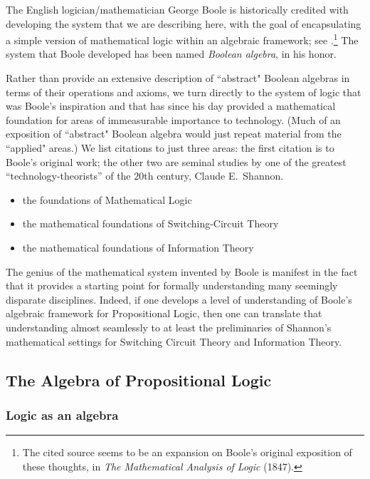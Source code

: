 The English logician/mathematician George Boole is historically credited with developing the system that we are describing here, with the goal of encapsulating a simple version of
mathematical logic within an algebraic framework; see
\cite{Boole54}.\footnote{The cited source seems to be an expansion on Boole's original exposition of these thoughts, in {\it The Mathematical Analysis of Logic} (1847).}  The system that Boole developed has been named {\it Boolean algebra}, in his honor.

Rather than provide an extensive description of ``abstract" Boolean algebras in terms of their operations and axioms, we turn directly to the system of logic that was Boole's inspiration and that has since his day provided a mathematical foundation for areas of immeasurable importance to technology.  (Much of an exposition of ``abstract" Boolean algebra would just repeat material from the ``applied" areas.)  We list citations to just three areas: the first citation is to Boole's original work; the other two are seminal studies by one of the greatest ``technology-theorists'' of the $20$th century, Claude E.~Shannon. 
\begin{itemize}
\item
the foundations of Mathematical Logic \cite{Boole54}
\medskip\item
the mathematical foundations of Switching-Circuit Theory \cite{Shannon38}
\medskip\item
the mathematical foundations of Information Theory \cite{Shannon48}
\end{itemize}
The genius of the mathematical system invented by Boole is manifest in the fact that it provides a starting point for formally understanding many seemingly disparate disciplines.  Indeed, if one develops a level of understanding of Boole's algebraic framework for Propositional Logic, then one can translate that understanding almost seamlessly to at least the preliminaries of Shannon's mathematical settings for Switching Circuit Theory and Information Theory.
 

\subsection{The Algebra of Propositional Logic}
\label{sec:Propositional-logic}

\subsubsection{Logic as an algebra}
\label{sec:logic-as-algebra}

